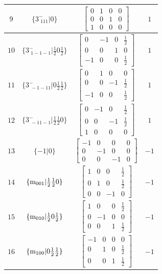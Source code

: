 \documentclass[fleqn,8pt]{jsarticle}
\begin{document}
\begin{longtable}{cccc}
$ 9 $ & $ \{3^{-}_{\,\,111}|0\} $ & $ \begin{bmatrix} 0 & 1 & 0 & 0 \\ 0 & 0 & 1 & 0 \\ 1 & 0 & 0 & 0 \end{bmatrix} $ & $ 1 $ \\ \hline
$ 10 $ & $ \{3^{-}_{\,\,1-1-1}|\frac{1}{2} 0 \frac{1}{2}\} $ & $ \begin{bmatrix} 0 & -1 & 0 & \frac{1}{2} \\ 0 & 0 & 1 & 0 \\ -1 & 0 & 0 & \frac{1}{2} \end{bmatrix} $ & $ 1 $ \\ \hline
$ 11 $ & $ \{3^{-}_{\,\,-1-11}|0 \frac{1}{2} \frac{1}{2}\} $ & $ \begin{bmatrix} 0 & 1 & 0 & 0 \\ 0 & 0 & -1 & \frac{1}{2} \\ -1 & 0 & 0 & \frac{1}{2} \end{bmatrix} $ & $ 1 $ \\ \hline
$ 12 $ & $ \{3^{-}_{\,\,-11-1}|\frac{1}{2} \frac{1}{2} 0\} $ & $ \begin{bmatrix} 0 & -1 & 0 & \frac{1}{2} \\ 0 & 0 & -1 & \frac{1}{2} \\ 1 & 0 & 0 & 0 \end{bmatrix} $ & $ 1 $ \\ \hline
$ 13 $ & $ \{-1|0\} $ & $ \begin{bmatrix} -1 & 0 & 0 & 0 \\ 0 & -1 & 0 & 0 \\ 0 & 0 & -1 & 0 \end{bmatrix} $ & $ -1 $ \\ \hline
$ 14 $ & $ \{{\rm m}_{001}|\frac{1}{2} \frac{1}{2} 0\} $ & $ \begin{bmatrix} 1 & 0 & 0 & \frac{1}{2} \\ 0 & 1 & 0 & \frac{1}{2} \\ 0 & 0 & -1 & 0 \end{bmatrix} $ & $ -1 $ \\ \hline
$ 15 $ & $ \{{\rm m}_{010}|\frac{1}{2} 0 \frac{1}{2}\} $ & $ \begin{bmatrix} 1 & 0 & 0 & \frac{1}{2} \\ 0 & -1 & 0 & 0 \\ 0 & 0 & 1 & \frac{1}{2} \end{bmatrix} $ & $ -1 $ \\ \hline
$ 16 $ & $ \{{\rm m}_{100}|0 \frac{1}{2} \frac{1}{2}\} $ & $ \begin{bmatrix} -1 & 0 & 0 & 0 \\ 0 & 1 & 0 & \frac{1}{2} \\ 0 & 0 & 1 & \frac{1}{2} \end{bmatrix} $ & $ -1 $ \\ \hline

\end{longtable}
\end{document}
